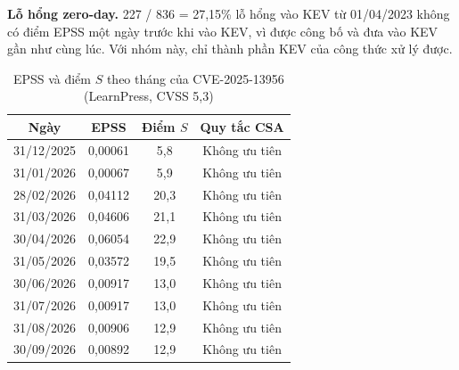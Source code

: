 \documentclass[runningheads]{llncs}
\begin{document}
\textbf{Lỗ hổng zero-day.} 227 / 836 = 27,15\% lỗ hổng vào KEV từ 01/04/2023 không có điểm EPSS một ngày trước
khi vào KEV, vì được công bố và đưa vào KEV gần như cùng lúc. Với nhóm này, chỉ thành phần KEV của công thức xử lý được.

\begin{table}
\centering
\caption{EPSS và điểm $S$ theo tháng của CVE-2025-13956 (LearnPress, CVSS 5,3)}\label{tab:crowdsec}
\small
\begin{tabular}{cccc}
\toprule
Ngày & EPSS & Điểm $S$ & Quy tắc CSA \\
\midrule
31/12/2025 & 0,00061 & 5,8 & Không ưu tiên \\
31/01/2026 & 0,00067 & 5,9 & Không ưu tiên \\
28/02/2026 & 0,04112 & 20,3 & Không ưu tiên \\
31/03/2026 & 0,04606 & 21,1 & Không ưu tiên \\
30/04/2026 & 0,06054 & 22,9 & Không ưu tiên \\
31/05/2026 & 0,03572 & 19,5 & Không ưu tiên \\
30/06/2026 & 0,00917 & 13,0 & Không ưu tiên \\
31/07/2026 & 0,00917 & 13,0 & Không ưu tiên \\
31/08/2026 & 0,00906 & 12,9 & Không ưu tiên \\
30/09/2026 & 0,00892 & 12,9 & Không ưu tiên \\
\bottomrule
\end{tabular}
\end{table}
\end{document}

